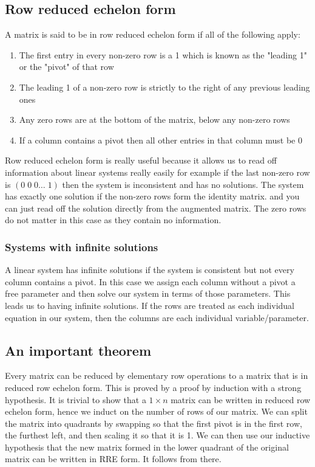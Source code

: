 \documentclass[12pt]{article}
\begin{document}
\subsection*{Row reduced echelon form}
A matrix is said to be in row reduced echelon form if all of the following apply:
\begin{enumerate}
    \item The first entry in every non-zero row is a 1 which is known as the "leading 1" or the "pivot" of that row
    \item The leading 1 of a non-zero row is strictly to the right of any previous leading ones
    \item Any zero rows are at the bottom of the matrix, below any non-zero rows
    \item If a column contains a pivot then all other entries in that column must be 0
\end{enumerate}
Row reduced echelon form is really useful because it allows us to read off information about linear systems really easily for example if the last non-zero row is \((0\;0\;0\dots\;1)\) then the system is inconsistent and has no solutions. The system has exactly one solution if the non-zero rows form the identity matrix. and you can just read off the solution directly from the augmented matrix. The zero rows do not matter in this case as they contain no information. 
\subsubsection*{Systems with infinite solutions}
A linear system has infinite solutions if the system is consistent but not every column contains a pivot. In this case we assign each column without a pivot a free parameter and then solve our system in terms of those parameters. This leads us to having infinite solutions. If the rows are treated as each individual equation in our system, then the columns are each individual variable/parameter.
\subsection*{An important theorem}
Every matrix can be reduced by elementary row operations to a matrix that is in reduced row echelon form. This is proved by a proof by induction with a strong hypothesis. It is trivial to show that a \(1\times n\) matrix can be written in reduced row echelon form, hence we induct on the number of rows of our matrix. We can split the matrix into quadrants by swapping so that the first pivot is in the first row, the furthest left, and then scaling it so that it is 1. We can then use our inductive hypothesis that the new matrix formed in the lower quadrant of the original matrix can be written in RRE form. It follows from there.
\end{document}
